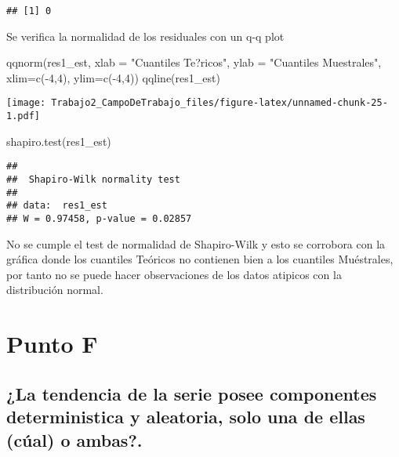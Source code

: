 \documentclass[
]{article}
\newenvironment{Shaded}{\begin{snugshade}}{\end{snugshade}}
\newcommand{\AttributeTok}[1]{\textcolor[rgb]{0.77,0.63,0.00}{#1}}
\newcommand{\DecValTok}[1]{\textcolor[rgb]{0.00,0.00,0.81}{#1}}
\newcommand{\FunctionTok}[1]{\textcolor[rgb]{0.00,0.00,0.00}{#1}}
\newcommand{\NormalTok}[1]{#1}
\newcommand{\SpecialCharTok}[1]{\textcolor[rgb]{0.00,0.00,0.00}{#1}}
\newcommand{\StringTok}[1]{\textcolor[rgb]{0.31,0.60,0.02}{#1}}
\begin{document}
\begin{verbatim}
## [1] 0
\end{verbatim}

Se verifica la normalidad de los residuales con un q-q plot

\begin{Shaded}
\begin{Highlighting}[]
\FunctionTok{qqnorm}\NormalTok{(res1\_est, }\AttributeTok{xlab =} \StringTok{"Cuantiles Te?ricos"}\NormalTok{, }\AttributeTok{ylab =} \StringTok{"Cuantiles Muestrales"}\NormalTok{,}
\AttributeTok{xlim=}\FunctionTok{c}\NormalTok{(}\SpecialCharTok{{-}}\DecValTok{4}\NormalTok{,}\DecValTok{4}\NormalTok{), }\AttributeTok{ylim=}\FunctionTok{c}\NormalTok{(}\SpecialCharTok{{-}}\DecValTok{4}\NormalTok{,}\DecValTok{4}\NormalTok{))}
\FunctionTok{qqline}\NormalTok{(res1\_est)}
\end{Highlighting}
\end{Shaded}

\texttt{[image: Trabajo2\_CampoDeTrabajo\_files/figure-latex/unnamed-chunk-25-1.pdf]}

\begin{Shaded}
\begin{Highlighting}[]
\FunctionTok{shapiro.test}\NormalTok{(res1\_est)}
\end{Highlighting}
\end{Shaded}

\begin{verbatim}
## 
##  Shapiro-Wilk normality test
## 
## data:  res1_est
## W = 0.97458, p-value = 0.02857
\end{verbatim}

No se cumple el test de normalidad de Shapiro-Wilk y esto se corrobora
con la gráfica donde los cuantiles Teóricos no contienen bien a los
cuantiles Muéstrales, por tanto no se puede hacer observaciones de los
datos atipicos con la distribución normal.

\hypertarget{punto-f}{%
\section{Punto F}\label{punto-f}}

\hypertarget{la-tendencia-de-la-serie-posee-componentes-deterministica-y-aleatoria-solo-una-de-ellas-cuxfaal-o-ambas.}{%
\subsection{¿La tendencia de la serie posee componentes deterministica y
aleatoria, solo una de ellas (cúal) o
ambas?.}\label{la-tendencia-de-la-serie-posee-componentes-deterministica-y-aleatoria-solo-una-de-ellas-cuxfaal-o-ambas.}}
\end{document}
